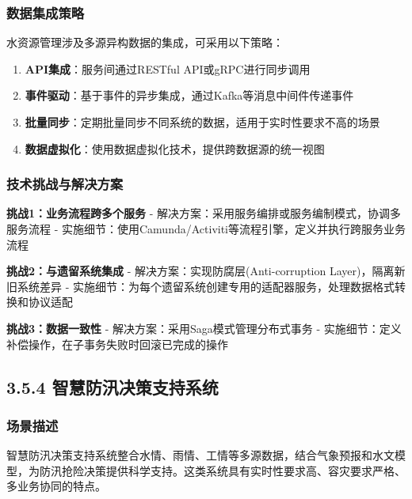 \subsubsection{数据集成策略}\label{ux6570ux636eux96c6ux6210ux7b56ux7565}

水资源管理涉及多源异构数据的集成，可采用以下策略：

\begin{enumerate}
\def\labelenumi{\arabic{enumi}.}
\tightlist
\item
  \textbf{API集成}：服务间通过RESTful API或gRPC进行同步调用
\item
  \textbf{事件驱动}：基于事件的异步集成，通过Kafka等消息中间件传递事件
\item
  \textbf{批量同步}：定期批量同步不同系统的数据，适用于实时性要求不高的场景
\item
  \textbf{数据虚拟化}：使用数据虚拟化技术，提供跨数据源的统一视图
\end{enumerate}

\subsubsection{技术挑战与解决方案}\label{ux6280ux672fux6311ux6218ux4e0eux89e3ux51b3ux65b9ux6848-1}

\textbf{挑战1：业务流程跨多个服务} -
解决方案：采用服务编排或服务编制模式，协调多服务流程 -
实施细节：使用Camunda/Activiti等流程引擎，定义并执行跨服务业务流程

\textbf{挑战2：与遗留系统集成} - 解决方案：实现防腐层(Anti-corruption
Layer)，隔离新旧系统差异 -
实施细节：为每个遗留系统创建专用的适配器服务，处理数据格式转换和协议适配

\textbf{挑战3：数据一致性} - 解决方案：采用Saga模式管理分布式事务 -
实施细节：定义补偿操作，在子事务失败时回滚已完成的操作

\subsection{3.5.4
智慧防汛决策支持系统}\label{ux667aux6167ux9632ux6c5bux51b3ux7b56ux652fux6301ux7cfbux7edf}

\subsubsection{场景描述}\label{ux573aux666fux63cfux8ff0-3}

智慧防汛决策支持系统整合水情、雨情、工情等多源数据，结合气象预报和水文模型，为防汛抢险决策提供科学支持。这类系统具有实时性要求高、容灾要求严格、多业务协同的特点。

